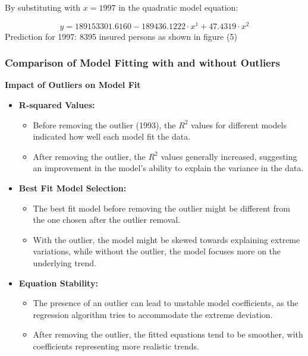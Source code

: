 \documentclass[12pt]{article}
\begin{document}
By substituting with \( x = 1997 \) in the quadratic model equation:

\[
y = 189153301.6160 - 189436.1222 \cdot x^1 + 47.4319 \cdot x^2 
\]
Prediction for 1997: 8395 insured persons as shown in figure (5)

\subsubsection*{Comparison of Model Fitting with and without Outliers}
\textbf{Impact of Outliers on Model Fit}

\begin{itemize}
    \item \textbf{R-squared Values:}
    \begin{itemize}
        \item Before removing the outlier (1993), the \( R^2 \) values for different models indicated how well each model fit the data.
        \item After removing the outlier, the \( R^2 \) values generally increased, suggesting an improvement in the model’s ability to explain the variance in the data.
    \end{itemize}

    \item \textbf{Best Fit Model Selection:}
    \begin{itemize}
        \item The best fit model before removing the outlier might be different from the one chosen after the outlier removal.
        \item With the outlier, the model might be skewed towards explaining extreme variations, while without the outlier, the model focuses more on the underlying trend.
    \end{itemize}

    \item \textbf{Equation Stability:}
    \begin{itemize}
        \item The presence of an outlier can lead to unstable model coefficients, as the regression algorithm tries to accommodate the extreme deviation.
        \item After removing the outlier, the fitted equations tend to be smoother, with coefficients representing more realistic trends.
    \end{itemize}


\end{itemize}
\end{document}
